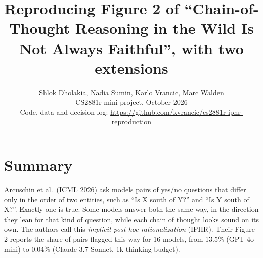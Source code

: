 \documentclass[10pt]{article}
\title{\vspace{-1.8em}\Large Reproducing Figure 2 of ``Chain-of-Thought Reasoning in the Wild Is Not Always Faithful'', with two extensions}
\author{Shlok Dholakia, Nadia Sumin, Karlo Vrancic, Marc Walden\\ \small CS2881r mini-project, October 2026\\ \small Code, data and decision log: \url{https://github.com/kvrancic/cs2881r-iphr-reproduction}}
\date{\vspace{-2.4em}}
\begin{document}
\maketitle

\section*{Summary}
Arcuschin et al.\ (ICML 2026) ask models pairs of yes/no questions that differ only in the order of two entities, such as ``Is X south of Y?'' and ``Is Y south of X?''. Exactly one is true. Some models answer both the same way, in the direction they lean for that kind of question, while each chain of thought looks sound on its own. The authors call this \emph{implicit post-hoc rationalization} (IPHR). Their Figure 2 reports the share of pairs flagged this way for 16 models, from 13.5\% (GPT-4o-mini) to 0.04\% (Claude 3.7 Sonnet, 1k thinking budget).
\end{document}
